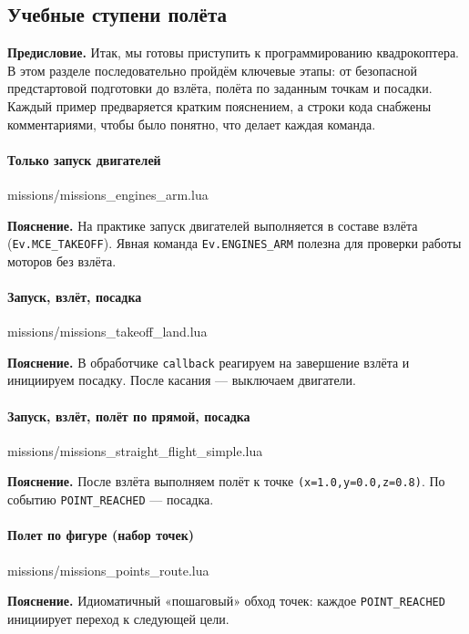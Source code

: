 \subsection{Учебные ступени полёта}
\textbf{Предисловие.} Итак, мы готовы приступить к программированию квадрокоптера. В этом разделе последовательно пройдём ключевые этапы: от безопасной предстартовой подготовки до взлёта, полёта по заданным точкам и посадки. Каждый пример предваряется кратким пояснением, а строки кода снабжены комментариями, чтобы было понятно, что делает каждая команда.
\paragraph{Только запуск двигателей}
\begin{codefile}{missions/missions_engines_arm.lua}
\end{codefile}
\textbf{Пояснение.} На практике запуск двигателей выполняется в составе взлёта (\texttt{Ev.MCE\_TAKEOFF}). Явная команда \texttt{Ev.ENGINES\_ARM} полезна для проверки работы моторов без взлёта.

\paragraph{Запуск, взлёт, посадка}
\begin{codefile}{missions/missions_takeoff_land.lua}
\end{codefile}
\textbf{Пояснение.} В обработчике \texttt{callback} реагируем на завершение взлёта и инициируем посадку. После касания — выключаем двигатели.

\paragraph{Запуск, взлёт, полёт по прямой, посадка}
\begin{codefile}{missions/missions_straight_flight_simple.lua}
\end{codefile}
\textbf{Пояснение.} После взлёта выполняем полёт к точке \texttt{(x=1.0,y=0.0,z=0.8)}. По событию \texttt{POINT\_REACHED} — посадка.

\paragraph{Полет по фигуре (набор точек)}
\begin{codefile}{missions/missions_points_route.lua}
\end{codefile}
\textbf{Пояснение.} Идиоматичный «пошаговый» обход точек: каждое \texttt{POINT\_REACHED} инициирует переход к следующей цели.


